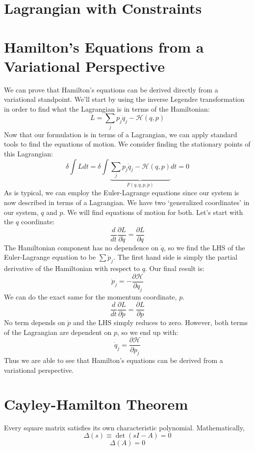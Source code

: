 \section{Lagrangian with Constraints}\label{lagran constraint}



\section{Hamilton's Equations from a Variational Perspective}\label{proof:hamilton}

We can prove that Hamilton's equations can be derived directly from a variational standpoint. We'll start by using the inverse Legendre transformation in order to find what the \gls{Lagrangian} is in terms of the \gls{Hamiltonian}:
$$L=\sum_j p_j\dot{q}_j-\mathcal{H}(q,p)$$
Now that our formulation is in terms of a \gls{Lagrangian}, we can apply standard tools to find the equations of motion. We consider finding the stationary points of this \gls{Lagrangian}:
$$\delta\int Ldt=\delta\int\underbrace{\sum_j p_j\dot{q}_j-\mathcal{H}(q,p)}_{F(q,\dot{q},p,\dot{p})}dt=0$$
As is typical, we can employ the Euler-Lagrange equations since our system is now described in terms of a Lagrangian. We have two `generalized coordinates' in our system, $q$ and $p$. We will find equations of motion for both. Let's start with the $q$ coordinate:
$$\frac{d}{dt}\frac{\partial L}{\partial \dot{q}}=\frac{\partial L}{\partial q}$$
The \gls{Hamiltonian} component has no dependence on $\dot{q}$, so we find the LHS of the Euler-Lagrange equation to be $\sum \dot{p}_j$. The first hand side is simply the partial derivative of the \gls{Hamiltonian} with respect to $q$. Our final result is:
$$\dot{p}_j=-\frac{\partial \mathcal{H}}{\partial q_j}$$
We can do the exact same for the momentum coordinate, $p$.
$$\frac{d}{dt}\frac{\partial L}{\partial \dot{p}}=\frac{\partial L}{\partial p}$$
No term depends on $\dot{p}$ and the LHS simply reduces to zero. However, both terms of the \gls{Lagrangian} are dependent on $p$, so we end up with:
$$\dot{q}_j=\frac{\partial \mathcal{H}}{\partial p_j}$$
Thus we are able to see that Hamilton's equations can be derived from a variational perspective.

\section{Cayley-Hamilton Theorem}\label{cayley hamilton}
\begin{theorem}
Every square matrix satisfies its own characteristic polynomial. Mathematically, 
$$\Delta(s)\equiv\det(s I-A)=0$$
$$\Delta(A)=0$$
\end{theorem}

